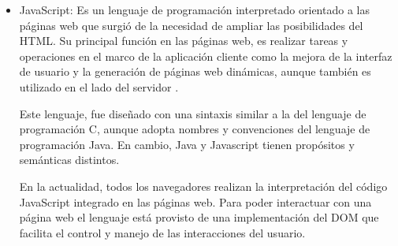 \begin{itemize}
\item JavaScript: Es un lenguaje de programación interpretado orientado a las páginas web que surgió de la necesidad de ampliar las posibilidades del HTML. Su principal función en las páginas web, es realizar tareas y operaciones en el marco de la aplicación cliente como la mejora de la interfaz de usuario y la generación de páginas web dinámicas, aunque también es utilizado en el lado del servidor .

Este lenguaje, fue diseñado con una sintaxis similar a la del lenguaje de programación C, aunque adopta nombres y convenciones del lenguaje de programación Java. En cambio, Java y Javascript tienen propósitos y semánticas distintos.

En la actualidad, todos los navegadores realizan la interpretación del código JavaScript integrado en las páginas web. Para poder interactuar con una página web el lenguaje está provisto de una implementación del DOM que facilita el control y manejo de las interacciones del usuario.

\end{itemize}





